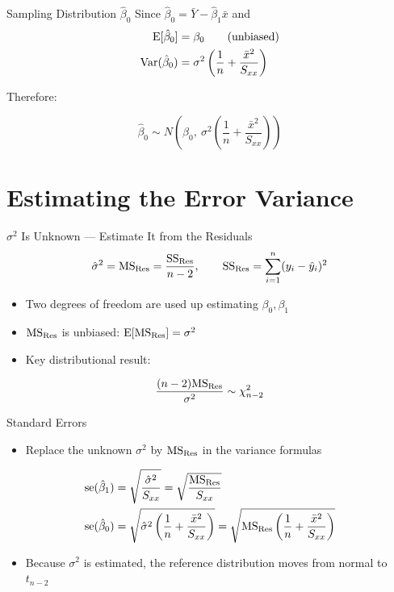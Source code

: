 \begin{frame}{Sampling Distribution $\hat\beta_0$}
	Since \(\hat\beta_0 = \bar Y-\hat\beta_1\bar x\) and 
	\begin{align*}
		\operatorname{E}[\hat\beta_0] &= \beta_0 \qquad\text{(unbiased)}\\
		\operatorname{Var}(\hat\beta_0) &= \sigma^2\left(\frac1n+\frac{\bar x^2}{S_{xx}}\right)
	\end{align*}

	Therefore:
	
	\[
		\hat\beta_0 \sim N\!\left(\beta_0,\ \sigma^2\left(\frac1n+\frac{\bar x^2}{S_{xx}}\right)\right)
	\]
\end{frame}


\section{Estimating the Error Variance}


\begin{frame}{$\sigma^2$ Is Unknown --- Estimate It from the Residuals}
	\[
		\hat\sigma^2 = \mathrm{MS}_{\mathrm{Res}} = \frac{\mathrm{SS}_{\mathrm{Res}}}{n-2}, \qquad \mathrm{SS}_{\mathrm{Res}}=\sum_{i=1}^n(y_i-\hat y_i)^2
	\]
	\begin{itemize}
		\item Two degrees of freedom are used up estimating $\beta_0,\beta_1$
		\item $\mathrm{MS}_{\mathrm{Res}}$ is unbiased: $\operatorname{E}[\mathrm{MS}_{\mathrm{Res}}]=\sigma^2$
		\item Key distributional result:
	\end{itemize}
	\[
		\frac{(n-2)\mathrm{MS}_{\mathrm{Res}}}{\sigma^2} \sim \chi^2_{n-2}
	\]
\end{frame}


\begin{frame}{Standard Errors}
	\begin{itemize}
		\item Replace the unknown $\sigma^2$ by $\mathrm{MS}_{\mathrm{Res}}$ in the variance formulas
	\end{itemize}
	\begin{align*}
		\operatorname{se}(\hat\beta_1) &= \sqrt{\frac{\hat{\sigma}^2}{S_{xx}}} = \sqrt{\frac{\mathrm{MS}_{\mathrm{Res}}}{S_{xx}}}\\
		\operatorname{se}(\hat\beta_0) &= \sqrt{\hat{\sigma}^2 \left(\frac1n+\frac{\bar x^2}{S_{xx}}\right)} = \sqrt{\mathrm{MS}_{\mathrm{Res}}\left(\frac1n+\frac{\bar x^2}{S_{xx}}\right)}
	\end{align*}
	\begin{itemize}
		\item Because $\sigma^2$ is estimated, the reference distribution moves from normal to $t_{n-2}$
	\end{itemize}
\end{frame}


